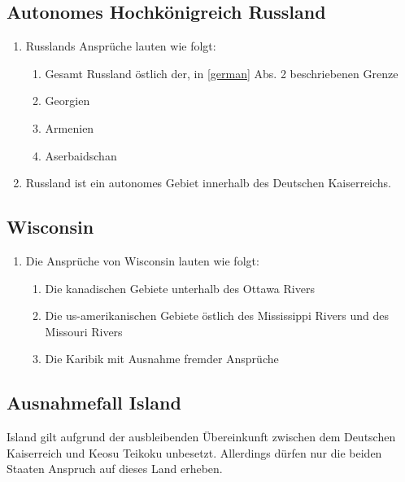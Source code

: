 \documentclass{article}
\begin{document}
\subsection{Autonomes Hochkönigreich Russland}
\begin{enumerate}[(1)]
    \item Russlands Ansprüche lauten wie folgt:
    \begin{enumerate}
        \item Gesamt Russland östlich der, in \ref{german} Abs. 2 beschriebenen Grenze
        \item Georgien
        \item Armenien
        \item Aserbaidschan
    \end{enumerate}
    \item Russland ist ein autonomes Gebiet innerhalb des Deutschen Kaiserreichs.
\end{enumerate}

\subsection{Wisconsin}
\begin{enumerate}[(1)]
    \item Die Ansprüche von Wisconsin lauten wie folgt:
    \begin{enumerate}[1.]
        \item Die kanadischen Gebiete unterhalb des Ottawa Rivers
        \item Die us-amerikanischen Gebiete östlich des Mississippi Rivers und des Missouri Rivers
        \item Die Karibik mit Ausnahme fremder Ansprüche
    \end{enumerate}
\end{enumerate}

\subsection{Ausnahmefall Island}
Island gilt aufgrund der ausbleibenden Übereinkunft zwischen dem Deutschen Kaiserreich und Keosu Teikoku unbesetzt. Allerdings dürfen nur die beiden
Staaten Anspruch auf dieses Land erheben.
\end{document}
